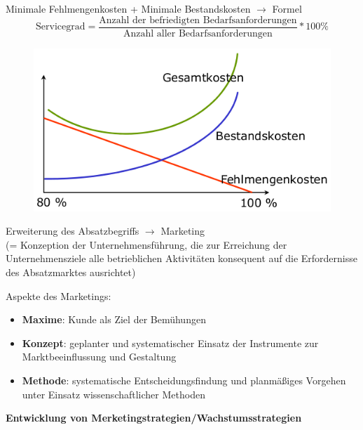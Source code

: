 \documentclass[a4paper,11pt, twoside]{article}
\begin{document}
Minimale Fehlmengenkosten + Minimale Bestandskosten $\rightarrow$ Formel
\[
\text{Servicegrad} = \frac{\text{Anzahl der befriedigten Bedarfsanforderungen}}{\text{Anzahl aller Bedarfsanforderungen}} * 100\%
\]

\begin{figure}[h]
 \begin{center}
   \includegraphics[scale=0.3]{bilder/servicegrad.png}
 \end{center}
\end{figure}

Erweiterung des Absatzbegriffs $\rightarrow$ Marketing\\ 
(= Konzeption der Unternehmensführung, die zur Erreichung der Unternehmensziele alle betrieblichen Aktivitäten konsequent auf die Erfordernisse des Absatzmarktes ausrichtet)

Aspekte des Marketings:
\begin{itemize}
	\item \textbf{Maxime}: Kunde als Ziel der Bemühungen
	\item  \textbf{Konzept}: geplanter und systematischer Einsatz der Instrumente zur Marktbeeinflussung und Gestaltung
	\item \textbf{Methode}: systematische Entscheidungsfindung und planmäßiges Vorgehen unter Einsatz wissenschaftlicher Methoden
\end{itemize}

\textbf{Entwicklung von Merketingstrategien/Wachstumsstrategien} 
\end{document}
